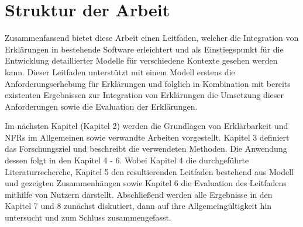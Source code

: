 \section{Struktur der Arbeit}

Zusammenfassend bietet diese Arbeit einen Leitfaden, welcher die Integration von Erklärungen in bestehende Software erleichtert und als Einstiegspunkt für die Entwicklung detaillierter Modelle für verschiedene Kontexte gesehen werden kann. Dieser Leitfaden unterstützt mit einem Modell erstens die Anforderungserhebung für Erklärungen und folglich in Kombination mit bereits existenten Ergebnissen zur Integration von Erklärungen die Umsetzung dieser Anforderungen sowie die Evaluation der Erklärungen.

Im nächsten Kapitel (Kapitel 2) werden die Grundlagen von Erklärbarkeit und NFRs im Allgemeinen sowie verwandte Arbeiten vorgestellt. Kapitel 3 definiert das Forschungsziel und beschreibt die verwendeten Methoden. Die Anwendung dessen folgt in den Kapitel 4 - 6. Wobei Kapitel 4 die durchgeführte Literaturrecherche, Kapitel 5 den resultierenden Leitfaden bestehend aus Modell und gezeigten Zusammenhängen sowie Kapitel 6 die Evaluation des Leitfadens mithilfe von Nutzern darstellt. Abschließend werden alle Ergebnisse in den Kapitel 7 und 8 zunächst diskutiert, dann auf ihre Allgemeingültigkeit hin untersucht und zum Schluss zusammengefasst.